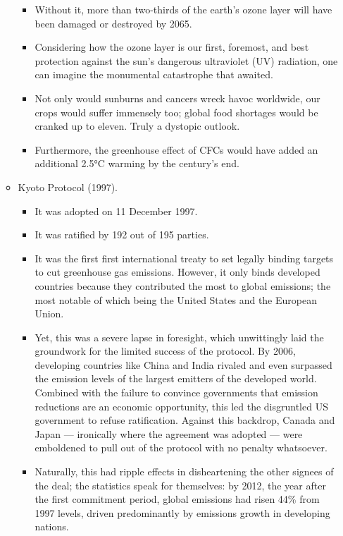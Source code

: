 \documentclass[oneside]{book}
\begin{document}
\begin{enumerate}
\begin{itemize}
\begin{itemize}
\begin{itemize}
            \end{itemize}
            \item Without it, more than two-thirds of the earth's ozone layer will have been damaged or destroyed by 2065. 
            \item Considering how the ozone layer is our first, foremost, and best protection against the sun's dangerous ultraviolet (UV) radiation, one can imagine the monumental catastrophe that awaited. 
            \item Not only would sunburns and cancers wreck havoc worldwide, our crops would suffer immensely too; global food shortages would be cranked up to eleven. Truly a dystopic outlook. 
            \item Furthermore, the greenhouse effect of CFCs would have added an additional 2.5°C warming by the century's end.
        \end{itemize}
        \item Kyoto Protocol (1997).
        \begin{itemize}
            \item It was adopted on 11 December 1997.
            \item It was ratified by 192 out of 195 parties.
            \item It was the first first international treaty to set legally binding targets to cut greenhouse gas emissions. However, it only binds developed countries because they contributed the most to global emissions; the most notable of which being the United States and the European Union.
            \item Yet, this was a severe lapse in foresight, which unwittingly laid the groundwork for the limited success of the protocol. By 2006, developing countries like China and India rivaled and even surpassed the emission levels of the largest emitters of the developed world. Combined with the failure to convince governments that emission reductions are an economic opportunity, this led the disgruntled US government to refuse ratification. Against this backdrop, Canada and Japan --- ironically where the agreement was adopted --- were emboldened to pull out of the protocol with no penalty whatsoever.
            \item Naturally, this had ripple effects in disheartening the other signees of the deal; the statistics speak for themselves: by 2012, the year after the first commitment period, global emissions had risen 44\% from 1997 levels, driven predominantly by emissions growth in developing nations.

\end{itemize}
\end{itemize}
\end{enumerate}
\end{document}
